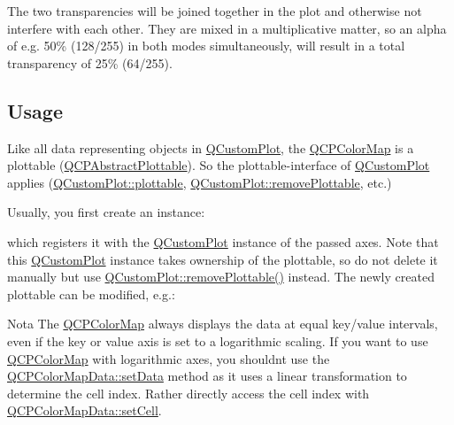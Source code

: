 The two transparencies will be joined together in the plot and otherwise not interfere with each other. They are mixed in a multiplicative matter, so an alpha of e.\+g. 50\% (128/255) in both modes simultaneously, will result in a total transparency of 25\% (64/255).\hypertarget{class_q_c_p_color_map_qcpcolormap-usage}{}\subsection{Usage}\label{class_q_c_p_color_map_qcpcolormap-usage}
Like all data representing objects in \hyperlink{class_q_custom_plot}{Q\+Custom\+Plot}, the \hyperlink{class_q_c_p_color_map}{Q\+C\+P\+Color\+Map} is a plottable (\hyperlink{class_q_c_p_abstract_plottable}{Q\+C\+P\+Abstract\+Plottable}). So the plottable-\/interface of \hyperlink{class_q_custom_plot}{Q\+Custom\+Plot} applies (\hyperlink{class_q_custom_plot_a32de81ff53e263e785b83b52ecd99d6f}{Q\+Custom\+Plot\+::plottable}, \hyperlink{class_q_custom_plot_af3dafd56884208474f311d6226513ab2}{Q\+Custom\+Plot\+::remove\+Plottable}, etc.)

Usually, you first create an instance\+: 
\begin{DoxyCodeInclude}
\end{DoxyCodeInclude}
which registers it with the \hyperlink{class_q_custom_plot}{Q\+Custom\+Plot} instance of the passed axes. Note that this \hyperlink{class_q_custom_plot}{Q\+Custom\+Plot} instance takes ownership of the plottable, so do not delete it manually but use \hyperlink{class_q_custom_plot_af3dafd56884208474f311d6226513ab2}{Q\+Custom\+Plot\+::remove\+Plottable()} instead. The newly created plottable can be modified, e.\+g.\+: 
\begin{DoxyCodeInclude}
\end{DoxyCodeInclude}
 \begin{DoxyNote}{Nota}
The \hyperlink{class_q_c_p_color_map}{Q\+C\+P\+Color\+Map} always displays the data at equal key/value intervals, even if the key or value axis is set to a logarithmic scaling. If you want to use \hyperlink{class_q_c_p_color_map}{Q\+C\+P\+Color\+Map} with logarithmic axes, you shouldn\textquotesingle{}t use the \hyperlink{class_q_c_p_color_map_data_afd2083ccfd6987ec94aa7ef8e91ca39a}{Q\+C\+P\+Color\+Map\+Data\+::set\+Data} method as it uses a linear transformation to determine the cell index. Rather directly access the cell index with \hyperlink{class_q_c_p_color_map_data_a8e75eaf8746596319032a93f3d2d0683}{Q\+C\+P\+Color\+Map\+Data\+::set\+Cell}. 
\end{DoxyNote}


